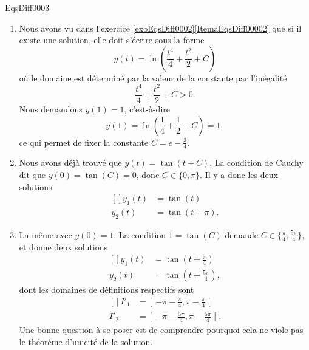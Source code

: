 
\begin{corrige}{EqsDiff0003}

\begin{enumerate}

\item
Nous avons vu dans l'exercice \ref{exoEqsDiff0002}\ref{ItemaEqsDiff00002} que si il existe une solution, elle doit s'écrire sous la forme
\begin{equation}
	y(t)=\ln\left( \frac{ t^4 }{ 4 }+\frac{ t^2 }{ 2 }+C \right)
\end{equation}
où le domaine est déterminé par la valeur de la constante par l'inégalité
\begin{equation}
	 \frac{ t^4 }{ 4 }+\frac{ t^2 }{ 2 }+C >0.
\end{equation}
Nous demandons $y(1)=1$, c'est-à-dire
\begin{equation}
	y(1)= \ln\left(\frac{ 1 }{ 4 }+\frac{ 1 }{ 2 }+C\right) =1,
\end{equation}
ce qui permet de fixer la constante $C=e-\frac{ 3 }{ 4 }$.

\item
Nous avons déjà trouvé que $y(t)=\tan(t+C)$. La condition de Cauchy dit que $y(0)=\tan(C)=0$, donc $C\in\{ 0,\pi \}$. Il y a donc les deux solutions
\begin{equation}
	\begin{aligned}[]
		y_1(t)&=\tan(t)\\
		y_2(t)&=\tan(t+\pi).
	\end{aligned}
\end{equation}

\item
La même avec $y(0)=1$. La condition $1=\tan(C)$ demande $C\in\{ \frac{ \pi }{ 4 },\frac{ 5\pi }{ 4 } \}$, et donne deux solutions
\begin{equation}
	\begin{aligned}[]
		y_1(t)&=\tan(t+\frac{ \pi }{ 4 })\\
		y_2(t)&=\tan(t+\frac{ 5\pi }{ 4 }),
	\end{aligned}
\end{equation}
dont les domaines de définitions respectifs sont
\begin{equation}
	\begin{aligned}[]
		I'_1&=\mathopen]-\pi-\frac{ \pi }{ 4 },\pi-\frac{ \pi }{ 4 }\mathclose[\\
		I'_2&=\mathopen]-\pi-\frac{ 5\pi }{ 4 },\pi-\frac{ 5\pi }{ 4 }\mathclose[.
	\end{aligned}
\end{equation}
Une bonne question à se poser est de comprendre pourquoi cela ne viole pas le théorème d'unicité de la solution.


\end{enumerate}
\end{corrige}
